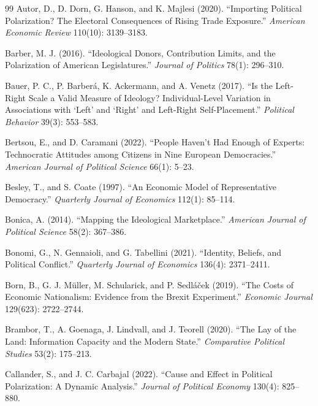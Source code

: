 \documentclass[12pt,letterpaper]{article}
\begin{document}
\begin{thebibliography}{99}
Autor, D., D. Dorn, G. Hanson, and K. Majlesi (2020). ``Importing Political Polarization? The Electoral Consequences of Rising Trade Exposure.'' \textit{American Economic Review} 110(10): 3139--3183.

Barber, M. J. (2016). ``Ideological Donors, Contribution Limits, and the Polarization of American Legislatures.'' \textit{Journal of Politics} 78(1): 296--310.

Bauer, P. C., P. Barber\'{a}, K. Ackermann, and A. Venetz (2017). ``Is the Left-Right Scale a Valid Measure of Ideology? Individual-Level Variation in Associations with `Left' and `Right' and Left-Right Self-Placement.'' \textit{Political Behavior} 39(3): 553--583.

Bertsou, E., and D. Caramani (2022). ``People Haven't Had Enough of Experts: Technocratic Attitudes among Citizens in Nine European Democracies.'' \textit{American Journal of Political Science} 66(1): 5--23.

Besley, T., and S. Coate (1997). ``An Economic Model of Representative Democracy.'' \textit{Quarterly Journal of Economics} 112(1): 85--114.

Bonica, A. (2014). ``Mapping the Ideological Marketplace.'' \textit{American Journal of Political Science} 58(2): 367--386.

Bonomi, G., N. Gennaioli, and G. Tabellini (2021). ``Identity, Beliefs, and Political Conflict.'' \textit{Quarterly Journal of Economics} 136(4): 2371--2411.

Born, B., G. J. M\"{u}ller, M. Schularick, and P. Sedl\'{a}\v{c}ek (2019). ``The Costs of Economic Nationalism: Evidence from the Brexit Experiment.'' \textit{Economic Journal} 129(623): 2722--2744.

Brambor, T., A. Goenaga, J. Lindvall, and J. Teorell (2020). ``The Lay of the Land: Information Capacity and the Modern State.'' \textit{Comparative Political Studies} 53(2): 175--213.

Callander, S., and J. C. Carbajal (2022). ``Cause and Effect in Political Polarization: A Dynamic Analysis.'' \textit{Journal of Political Economy} 130(4): 825--880.


\end{thebibliography}
\end{document}
